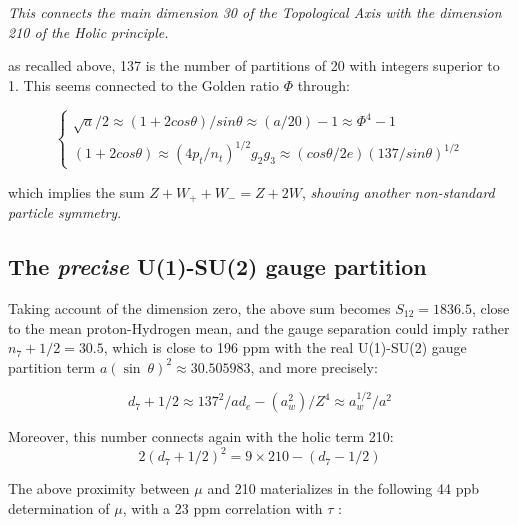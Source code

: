 \documentclass[a4paper,9pt]{article}
\begin{document}
\textit{This connects the main dimension 30 of the Topological Axis with the dimension 210 of the Holic principle.}

as recalled above, 137 is the number of partitions of 20 with integers superior to 1. This seems connected to the Golden ratio $\Phi$ through:

\begin{equation}\label{Eq37}
 \left\{
    \begin{array}{ll}
          \sqrt a/2 \approx (1+2cos\theta)/sin\theta \approx (a/20) -1 \approx \Phi^4 - 1 \\
           (1+2cos\theta) \approx (4p_t / n_t)^{1/2} g_2 g_3 \approx (cos\theta / 2e)(137/sin\theta)^{1/2}
    \end{array}
\right.
\end{equation}

which implies the sum $Z + W_+ + W_- = Z + 2W$, \textit{showing another non-standard particle symmetry}.



 \subsection{The \textit{precise} U(1)-SU(2) gauge partition}
 Taking account of the dimension zero, the above sum becomes $S_{12} = 1836.5$, close to the mean proton-Hydrogen mean, and the gauge separation could imply rather $n_7+1/2 = 30.5$, which is close to 196 ppm with the real U(1)-SU(2) gauge partition term $a (\sin~\theta)^2\approx 30.505983$, and more precisely:
 
 \begin{equation}\label{Eq39}
 d_7+1/2 \approx 137^2/ad_e -(a_w^2)/Z^4 \approx a_w^{1/2}/a^2
 \end{equation}
 
Moreover, this number connects again with the holic term 210:
% 
 \begin{equation}\label{Eq40}
 2(d_7+1/2)^2 = 9\times210 - (d_7-1/2)
 \end{equation}
 
 The above proximity between $\mu$ and 210 materializes in the following 44 ppb determination of $\mu$, with a 23 ppm correlation with $\tau$ : 
 
\end{document}
